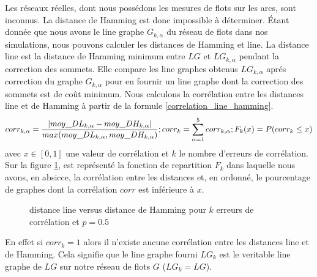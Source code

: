 Les r\'eseaux r\'eelles, dont nous poss\'edons les mesures de flots sur les arcs, sont inconnus.
La distance de Hamming est donc impossible \`a d\'eterminer.
\'Etant donn\'ee que nous avons le line graphe $G_{k,\alpha}$ du r\'eseau de flots dans nos simulations, nous pouvons calculer les distances de Hamming et line. 
\newline
La distance line est la distance de Hamming minimum entre $LG$ et $LG_{k,\alpha}$ pendant la correction des sommets. 
Elle compare les line graphes obtenus $LG_{k,\alpha}$ apr\'es correction du graphe $G_{k,\alpha}$ pour en fournir un line graphe dont la correction des sommets est de co\^ut minimum.
\newline
Nous calculons la corr\'elation entre les distances line et de Hamming \`a partir de la formule \ref{correlation_line_hamming}.
\begin{equation}
	corr_{k,\alpha} =  \frac{ | moy\_DL_{k, \alpha} - moy\_DH_{k, \alpha} | }{ max(moy\_DL_{k, \alpha},  moy\_DH_{k, \alpha}) };
	\\
	corr_{k} = \sum_{\alpha = 1}^{5}corr_{k,\alpha} ;
	\\
	F_k (x) = P(corr_{k} \le x ) 
\label{correlation_line_hamming}
\end{equation}
avec $x \in [0,1]$ une valeur de corr\'elation et $k$ le nombre d'erreurs de corr\'elation. 
\newline
Sur la figure \ref{dh_vs_dl_p_05}, est repr\'esent\'e la fonction de repartition $F_k$ dans laquelle nous avons, en absicce, la corr\'elation entre les distances et, en ordonn\'e, le pourcentage de graphes dont la corr\'elation $corr$ est inf\'erieure \`a $x$. 
\begin{figure}[htb!] 
\centering
\caption{ distance line versus distance de Hamming pour $k$ erreurs de corr\'elation et $p = 0.5$ }
\label{dh_vs_dl_p_05} 
\end{figure}
En effet si $corr_k = 1$ alors il n'existe aucune corr\'elation entre les distances line et de Hamming. Cela signifie que le line graphe fourni $LG_{k}$ est  le veritable line graphe de $LG$ sur notre r\'eseau de flots $G$ ($LG_{k} = LG$). 
